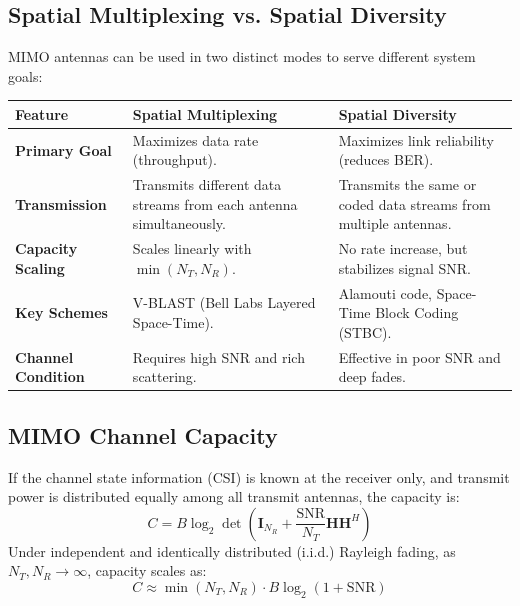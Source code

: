 \documentclass[12pt,a4paper]{article}
\renewcommand{\arraystretch}{1.45}
\begin{document}
\subsection{Spatial Multiplexing vs. Spatial Diversity}
MIMO antennas can be used in two distinct modes to serve different system goals:
\par\noindent
{\renewcommand{\arraystretch}{1.65}%
\begin{tabularx}{\linewidth}{|B{3.2cm}|Y|Y|}\hline
\textbf{Feature} & \textbf{Spatial Multiplexing} & \textbf{Spatial Diversity} \\
\hline
\textbf{Primary Goal} & Maximizes data rate (throughput). & Maximizes link reliability (reduces BER). \\[4pt]
\hline
\textbf{Transmission} & Transmits different data streams from each antenna simultaneously. & Transmits the same or coded data streams from multiple antennas. \\[4pt]
\hline
\textbf{Capacity Scaling} & Scales linearly with $\min(N_T, N_R)$. & No rate increase, but stabilizes signal SNR. \\[4pt]
\hline
\textbf{Key Schemes} & V-BLAST (Bell Labs Layered Space-Time). & Alamouti code, Space-Time Block Coding (STBC). \\[4pt]
\hline
\textbf{Channel Condition} & Requires high SNR and rich scattering. & Effective in poor SNR and deep fades. \\[4pt]
\hline
\end{tabularx}
}

\subsection{MIMO Channel Capacity}
If the channel state information (CSI) is known at the receiver only, and transmit power is distributed equally among all transmit antennas, the capacity is:
\begin{equation}
  C = B \log_2 \det \left( \mathbf{I}_{N_R} + \frac{\text{SNR}}{N_T} \mathbf{H} \mathbf{H}^H \right)
\end{equation}
Under independent and identically distributed (i.i.d.) Rayleigh fading, as $N_T, N_R \to \infty$, capacity scales as:
\begin{equation}
  C \approx \min(N_T, N_R) \cdot B \log_2(1 + \text{SNR})
\end{equation}
\end{document}
